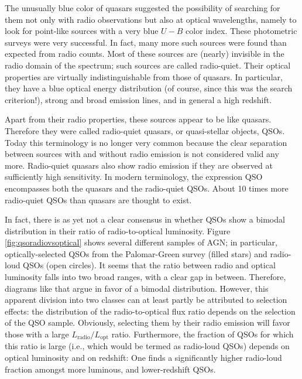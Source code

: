 \documentclass[a4paper,11pt]{article}
\begin{document}
{\noindent}The unusually blue color of quasars suggested the possibility of searching for them not only with radio observations but also at optical wavelengths, namely to look for point-like sources with a very blue $U-B$ color index. These photometric surveys were very successful. In fact, many more such sources were found than expected from radio counts. Most of these sources are (nearly) invisible in the radio domain of the spectrum; such sources are called radio-quiet. Their optical properties are virtually indistinguishable from those of quasars. In particular, they have a blue optical energy distribution (of course, since this was the search criterion!), strong and broad emission lines, and in general a high redshift.

{\noindent}Apart from their radio properties, these sources appear to be like quasars. Therefore they were called radio-quiet quasars, or quasi-stellar objects, QSOs. Today this terminology is no longer very common because the clear separation between sources with and without radio emission is not considered valid any more. Radio-quiet quasars also show radio emission if they are observed at sufficiently high sensitivity. In modern terminology, the expression QSO encompasses both the quasars and the radio-quiet QSOs. About 10 times more radio-quiet QSOs than quasars are thought to exist.

{\noindent}In fact, there is as yet not a clear consensus in whether QSOs show a bimodal distribution in their ratio of radio-to-optical luminosity. Figure \ref{fig:qsoradiovsoptical} shows several different samples of AGN; in particular, optically-selected QSOs from the Palomar-Green survey (filled stars) and radio-loud QSOs (open circles). It seems that the ratio between radio and optical luminosity falls into two broad ranges, with a clear gap in between. Therefore, diagrams like that argue in favor of a bimodal distribution. However, this apparent division into two classes can at least partly be attributed to selection effects: the distribution of the radio-to-optical flux ratio depends on the selection of the QSO sample. Obviously, selecting them by their radio emission will favor those with a large $L_\mathrm{radio}/L_\mathrm{opt}$ ratio. Furthermore, the fraction of QSOs for which this ratio is large (i.e., which would be termed as radio-loud QSOs) depends on optical luminosity and on redshift: One finds a significantly higher radio-loud fraction amongst more luminous, and lower-redshift QSOs.
\end{document}
